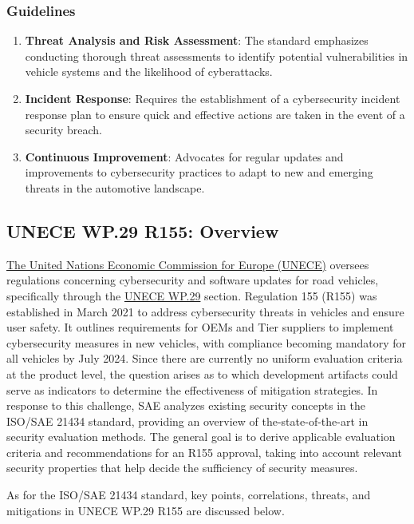 \subsubsection{Guidelines}\label{subsubsec:guidelines}
\begin{enumerate}
    \item \textbf{Threat Analysis and Risk Assessment}: The standard emphasizes conducting thorough threat assessments to identify potential vulnerabilities in vehicle systems and the likelihood of cyberattacks.
    \item \textbf{Incident Response}: Requires the establishment of a cybersecurity incident response plan to ensure quick and effective actions are taken in the event of a security breach.
    \item \textbf{Continuous Improvement}: Advocates for regular updates and improvements to cybersecurity practices to adapt to new and emerging threats in the automotive landscape.
\end{enumerate}

\subsection{UNECE WP.29 R155: Overview}\label{subsec:unece-wp-29-r155}

\href{https://unece.org/}{The United Nations Economic Commission for Europe (UNECE)} oversees regulations concerning cybersecurity and software updates for road vehicles, specifically through the
\href{https://unece.org/wp29-introduction}{UNECE WP.29} section.
Regulation 155 (R155) was established in March 2021 to address cybersecurity threats in vehicles and ensure user safety.
It outlines requirements for OEMs and Tier suppliers to implement cybersecurity measures in new vehicles,
with compliance becoming mandatory for all vehicles by July 2024.
Since there are currently no uniform evaluation criteria at the product level, the question arises as to which development artifacts could serve as indicators to determine the effectiveness of mitigation strategies.
In response to this challenge, SAE analyzes existing security concepts in the ISO/SAE 21434 standard, providing an overview of the-state-of-the-art in security evaluation methods.
The general goal is to derive applicable evaluation criteria and recommendations for an R155 approval,
taking into account relevant security properties that help decide the sufficiency of security measures\cite{hellstern2024cybersecurity}.

As for the ISO/SAE 21434 standard, key points, correlations, threats, and mitigations in UNECE WP.29 R155 are discussed below.

